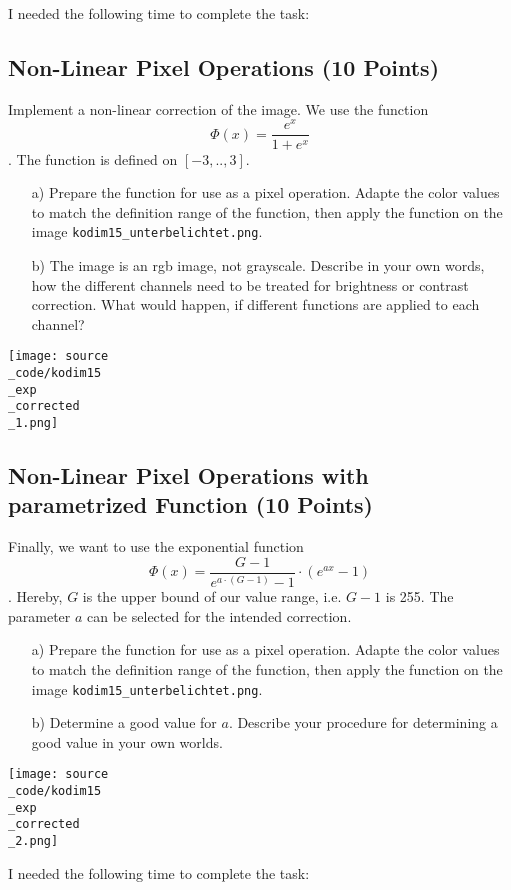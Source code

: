 I needed the following time to complete the task:

\subsection{Non-Linear Pixel Operations (10 Points)}

Implement a non-linear correction of the image. We use the function $$ \Phi(x) = \frac{e^x}{1+e^x}$$. The function is defined on $[-3,..,3]$. 

\begin{enumerate}
\item[a)] Prepare the function for use as a pixel operation. Adapte the color values to match the definition range of the function, then apply the function on the image \texttt{kodim15\_unterbelichtet.png}.
\item[b)] The image is an rgb image, not grayscale. Describe in your own words, how the different channels need to be treated for brightness or contrast correction. What would happen,
if different functions are applied to each channel?
\end{enumerate}

\texttt{[image: source\\\_code/kodim15\\\_exp\\\_corrected\\\_1.png]}

\subsection{Non-Linear Pixel Operations with parametrized Function (10 Points)}

Finally, we want to use the exponential function $$ \Phi(x) = \frac{G-1}{e^{a \cdot (G-1)} - 1} \cdot (e^{ax} - 1)$$. Hereby, $G$ is the upper bound of our value range, i.e. $G-1$ is 255. The
parameter $a$ can be selected for the intended correction.

\begin{enumerate}
\item[a)] Prepare the function for use as a pixel operation. Adapte the color values to match the definition range of the function, then apply the function on the image \texttt{kodim15\_unterbelichtet.png}.
\item[b)] Determine a good value for $a$. Describe your procedure for determining a good value in your own worlds.
\end{enumerate}

\texttt{[image: source\\\_code/kodim15\\\_exp\\\_corrected\\\_2.png]}

I needed the following time to complete the task:

